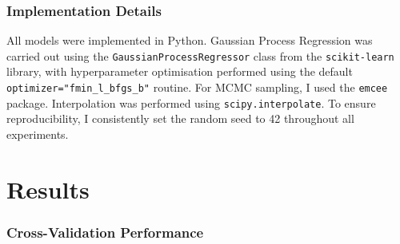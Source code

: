\documentclass[12pt]{article}
\begin{document}
\subsubsection*{Implementation Details}
All models were implemented in Python. Gaussian Process Regression was carried out using the \texttt{GaussianProcessRegressor} class from the \texttt{scikit-learn} library, with hyperparameter optimisation performed using the default \texttt{optimizer="fmin\_l\_bfgs\_b"} routine. 
For MCMC sampling, I used the \texttt{emcee} package. Interpolation was performed using \texttt{scipy.interpolate}. To ensure reproducibility, I consistently set the random seed to 42 throughout all experiments.
%
%
%
\section{Results}
\subsubsection*{Cross-Validation Performance}
\end{document}
